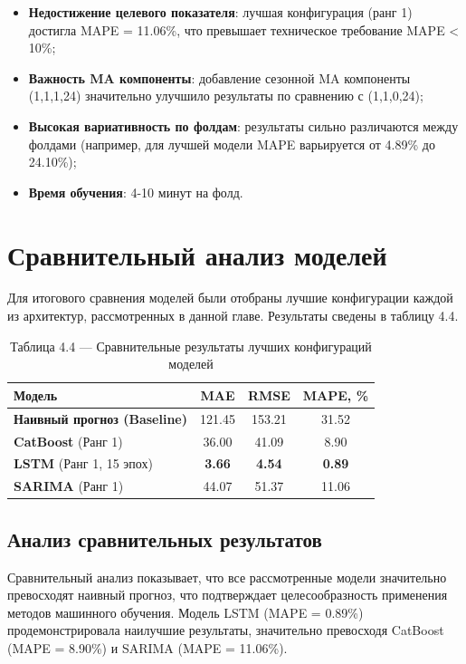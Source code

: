 \begin{itemize}
	\item \textbf{Недостижение целевого показателя}: лучшая конфигурация (ранг 1) достигла MAPE = 11.06\%, что превышает техническое требование MAPE < 10\%;
	\item \textbf{Важность MA компоненты}: добавление сезонной MA компоненты (1,1,1,24) значительно улучшило результаты по сравнению с (1,1,0,24);
	\item \textbf{Высокая вариативность по фолдам}: результаты сильно различаются между фолдами (например, для лучшей модели MAPE варьируется от 4.89\% до 24.10\%);
	\item \textbf{Время обучения}: 4-10 минут на фолд.
\end{itemize}

\section{Сравнительный анализ моделей}
\label{sec:model_comparison}

\hspace*{1.25cm}Для итогового сравнения моделей были отобраны лучшие конфигурации каждой из архитектур, рассмотренных в данной главе. Результаты сведены в таблицу 4.4.

\begin{table}[H]
	\centering
	\caption*{Таблица 4.4 --- Сравнительные результаты лучших конфигураций моделей}
	\begin{tabular}{|l|c|c|c|}
		\hline
		\textbf{Модель} & \textbf{MAE} & \textbf{RMSE} & \textbf{MAPE, \%} \\
		\hline
        \textbf{Наивный прогноз (Baseline)} & 121.45 & 153.21 & 31.52 \\
        \hline
		\textbf{CatBoost} (Ранг 1) & 36.00 & 41.09 & 8.90 \\
		\hline
		\textbf{LSTM} (Ранг 1, 15 эпох) & \textbf{3.66} & \textbf{4.54} & \textbf{0.89} \\
		\hline
		\textbf{SARIMA} (Ранг 1) & 44.07 & 51.37 & 11.06 \\
		\hline
	\end{tabular}
	\label{tab:comparison_results}
\end{table}

\subsection{Анализ сравнительных результатов}

\hspace*{1.25cm}Сравнительный анализ показывает, что все рассмотренные модели значительно превосходят наивный прогноз, что подтверждает целесообразность применения методов машинного обучения. Модель LSTM (MAPE = 0.89\%) продемонстрировала наилучшие результаты, значительно превосходя CatBoost (MAPE = 8.90\%) и SARIMA (MAPE = 11.06\%).

